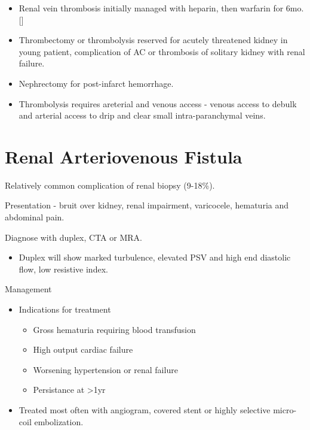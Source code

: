 \documentclass[
]{book}
\providecommand{\tightlist}{%
  \setlength{\itemsep}{0pt}\setlength{\parskip}{0pt}}
\begin{document}
\begin{itemize}
\item
  Renal vein thrombosis initially managed with heparin, then warfarin
  for 6mo. {[}\citep{asgharRenalVeinThrombosis2007, velazquez-ramirez129RenovascularDisease2019}{]}
\item
  Thrombectomy or thrombolysis reserved for acutely threatened kidney
  in young patient, complication of AC or thrombosis of solitary
  kidney with renal failure.
\item
  Nephrectomy for post-infarct hemorrhage.
\item
  Thrombolysis requires areterial and venous access - venous access to
  debulk and arterial access to drip and clear small intra-paranchymal
  veins.
\end{itemize}

\hypertarget{renal-arteriovenous-fistula}{%
\section{Renal Arteriovenous Fistula}\label{renal-arteriovenous-fistula}}

Relatively common complication of renal biopsy (9-18\%).
\citep{schwarzCourseRelevanceArteriovenous2008}

Presentation - bruit over kidney, renal impairment, varicocele,
hematuria and abdominal pain. \citep{hunter174AcquiredArteriovenous2019}

Diagnose with duplex, CTA or MRA.

\begin{itemize}
\tightlist
\item
  Duplex will show marked turbulence, elevated PSV and high end
  diastolic flow, low resistive index.
  \citep{ozbekImagedirectedColorDoppler1995}
\end{itemize}

Management

\begin{itemize}
\item
  Indications for treatment \citep{merkusHighIncidenceArteriovenous2005, morimotoUniqueCaseRenovascular1995}

  \begin{itemize}
  \item
    Gross hematuria requiring blood transfusion
  \item
    High output cardiac failure
  \item
    Worsening hypertension or renal failure
  \item
    Persistance at \textgreater1yr
  \end{itemize}
\item
  Treated most often with angiogram, covered stent or highly selective
  micro-coil embolization. \citep{ginatTranscatheterRenalArtery2009, saliouIdiopathicRenalArteriovenous1998}
\end{itemize}
\end{document}
